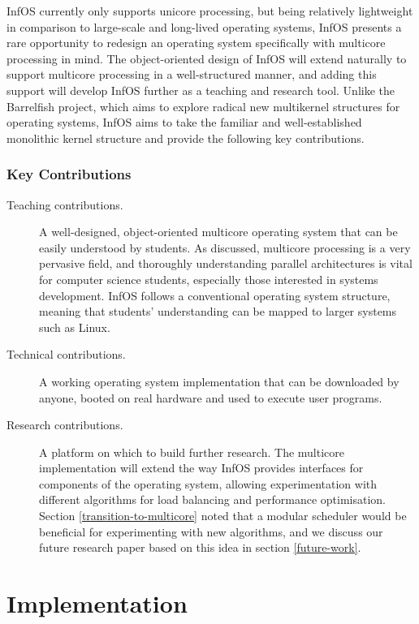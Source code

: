 \documentclass[bsc,frontabs,singlespacing,parskip,deptreport]{infthesis}
\begin{document}
InfOS currently only supports unicore processing, but being relatively lightweight in comparison to large-scale and long-lived operating systems, InfOS presents a rare opportunity to redesign an operating system specifically with multicore processing in mind. The object-oriented design of InfOS will extend naturally to support multicore processing in a well-structured manner, and adding this support will develop InfOS further as a teaching and research tool. Unlike the Barrelfish project, which aims to explore radical new multikernel structures for operating systems, InfOS aims to take the familiar and well-established monolithic kernel structure and provide the following key contributions.

\subsection{Key Contributions} \label{key-contributions}
\begin{description}
    \item [Teaching contributions.] A well-designed, object-oriented multicore operating system that can be easily understood by students. As discussed, multicore processing is a very pervasive field, and thoroughly understanding parallel architectures is vital for computer science students, especially those interested in systems development. InfOS follows a conventional operating system structure, meaning that students' understanding can be mapped to larger systems such as Linux.
    \item [Technical contributions.] A working operating system implementation that can be downloaded by anyone, booted on real hardware and used to execute user programs.
    \item [Research contributions.] A platform on which to build further research. The multicore implementation will extend the way InfOS provides interfaces for components of the operating system, allowing experimentation with different algorithms for load balancing and performance optimisation. Section \ref{transition-to-multicore} noted that a modular scheduler would be beneficial for experimenting with new algorithms, and we discuss our future research paper based on this idea in section \ref{future-work}.
\end{description}

\chapter{Implementation} \label{implementation}
\end{document}
